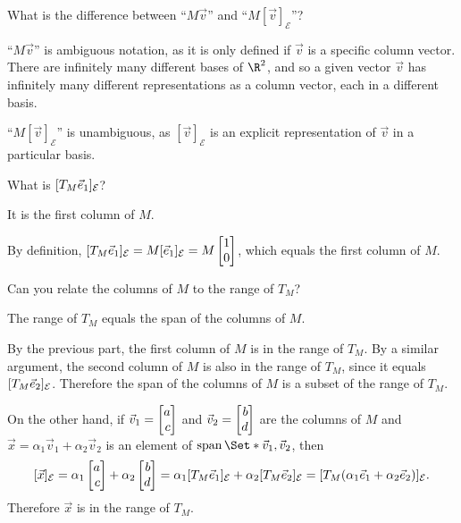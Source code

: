 \documentclass{problemset}
\begin{document}
	\begin{parts}
		\item What is the difference between
			``$M\vec v$'' and ``$M[\vec v]_{\mathcal E}$''?
			\begin{solution}
				``$M\vec v$'' is ambiguous notation, as it is only defined if
				$\vec v$ is a specific column vector. There are infinitely many
				different bases of $\R^2$, and so a given vector $\vec v$ has
				infinitely many different representations as a column vector,
				each in a different basis.

				``$M[\vec v]_{\mathcal E}$'' is unambiguous, as
				$[\vec v]_{\mathcal E}$ is an explicit representation of $\vec v$
				in a particular basis.
			\end{solution}
		\item What is $[T_M{\vec e_1}]_{\mathcal E}$?
			\begin{solution}
				It is the first column of $M$.

				By definition,
				$[T_M\xhat]_{\mathcal E}=M[\xhat]_{\mathcal E}=M\mat{1\\0}$,
				which equals the first column of $M$.
			\end{solution}
		\item \label{inducedTransform.3}
			Can you relate the columns of $M$ to the range of $T_M$?
			\begin{solution}
				The range of $T_M$ equals the span of the columns of $M$.

				By the previous part, the first column of $M$ is in the range of
				$T_M$. By a similar argument, the second column of $M$ is also
				in the range of $T_M$, since it equals $[T_M{\vec e_2}]_{\mathcal E}$.
				Therefore the span of the columns of $M$ is a subset of the range
				of $T_M$.

				On the other hand, if $\vec v_1=\mat{a\\c}$ and $\vec v_2=\mat{b\\d}$
				are the columns of $M$ and $\vec x = \alpha_1\vec v_1+\alpha_2\vec v_2$
				is an element of $\Span\Set*{\vec v_1,\vec v_2}$, then
				\[
					[\vec x]_{\mathcal E}
					=\alpha_1\mat{a\\c}+\alpha_2\mat{b\\d}
					=\alpha_1[T_M\xhat]_{\mathcal E}+\alpha_2[T_M\yhat]_{\mathcal E}
					=[T_M(\alpha_1\xhat+\alpha_2\yhat)]_{\mathcal E}.
				\]
				Therefore $\vec x$ is in the range of $T_M$.
			\end{solution}
	\end{parts}
\end{document}
